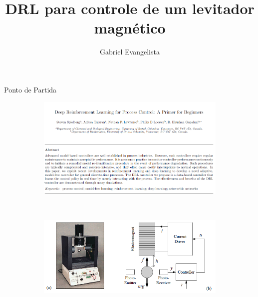 \documentclass[pdf]{beamer}
\title{DRL para controle de um levitador magnético}
\author{Gabriel Evangelista}
\begin{document}
\maketitle
\begin{frame}{Ponto de Partida}
	\begin{figure}
	\begin{subfigure}[t]{\textwidth}
		\centering
		\includegraphics[scale=.5]{img/artigo_inicial.png}
	\end{subfigure}\
	\begin{subfigure}[t]{\textwidth}
		\centering
		\includegraphics[scale=0.6]{img/planta_kit.png}
	\end{subfigure}
\end{figure}
\end{frame}
\end{document}
